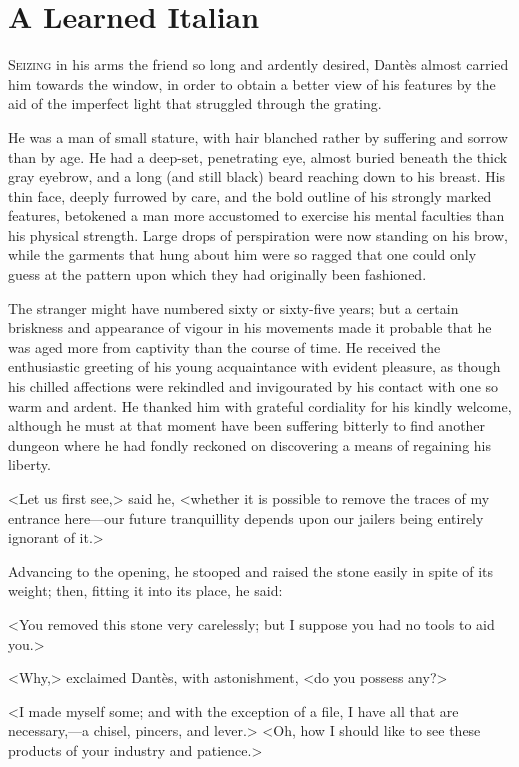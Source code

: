 \chapter{A Learned Italian} 

 \lettrine{S}{eizing} in his arms the friend so long and ardently desired, Dantès almost carried him towards the window, in order to obtain a better view of his features by the aid of the imperfect light that struggled through the grating. 

 He was a man of small stature, with hair blanched rather by suffering and sorrow than by age. He had a deep-set, penetrating eye, almost buried beneath the thick gray eyebrow, and a long (and still black) beard reaching down to his breast. His thin face, deeply furrowed by care, and the bold outline of his strongly marked features, betokened a man more accustomed to exercise his mental faculties than his physical strength. Large drops of perspiration were now standing on his brow, while the garments that hung about him were so ragged that one could only guess at the pattern upon which they had originally been fashioned. 

 The stranger might have numbered sixty or sixty-five years; but a certain briskness and appearance of vigour in his movements made it probable that he was aged more from captivity than the course of time. He received the enthusiastic greeting of his young acquaintance with evident pleasure, as though his chilled affections were rekindled and invigourated by his contact with one so warm and ardent. He thanked him with grateful cordiality for his kindly welcome, although he must at that moment have been suffering bitterly to find another dungeon where he had fondly reckoned on discovering a means of regaining his liberty. 

 <Let us first see,> said he, <whether it is possible to remove the traces of my entrance here—our future tranquillity depends upon our jailers being entirely ignorant of it.> 

 Advancing to the opening, he stooped and raised the stone easily in spite of its weight; then, fitting it into its place, he said: 

 <You removed this stone very carelessly; but I suppose you had no tools to aid you.> 

 <Why,> exclaimed Dantès, with astonishment, <do you possess any?> 

 <I made myself some; and with the exception of a file, I have all that are necessary,—a chisel, pincers, and lever.>  <Oh, how I should like to see these products of your industry and patience.> 

